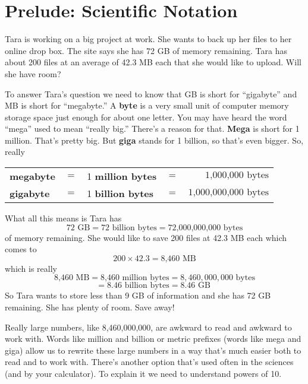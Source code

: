 \section{Prelude: Scientific Notation}

Tara is working on a big project at work.  She wants to back up her files to her online drop box. The site says she has 72 GB of memory remaining.  Tara has about 200 files at an average of 42.3 MB each that she would like to upload.  Will she have room?

To answer Tara's question we need to know that GB is short for ``gigabyte'' and MB is short for ``megabyte.''  A \textbf{byte} is a very small unit of computer memory storage space just enough for about one letter.  You may have heard the word ``mega'' used to mean ``really big.''  There's a reason for that.  \textbf{Mega} is short for 1 million.  That's pretty big.  But \textbf{giga} stands for 1 billion, so that's even bigger. So, really
\begin{center}
\begin{tabular} {lclcr} 
\textbf{megabyte} &$=$&1 \textbf{ million bytes} &$=$&$ \text{1,000,000 bytes}$\\
\textbf{gigabyte} &$=$& 1 \textbf{ billion bytes} &$=$& $\text{1,000,000,000 bytes}$\\ 
\end{tabular}
\end{center}

What all this means is Tara has
$$72\text{ GB} = 72 \text{ billion bytes} = \text{72,000,000,000 bytes}$$
of memory remaining.
She would like to save 200 files at 42.3 MB each which comes to
$$200 \times 42.3 = \text{8,460 MB}$$
which is really 
$$ \text{8,460 MB} = \text{8,460 million bytes} = 8,460,000,000 \text{ bytes}$$
$$= 8.46 \text{ billion bytes} = 8.46 \text{ GB }$$
So Tara wants to store less than 9 GB of information and she has 72 GB remaining.  She has plenty of room.  Save away!

Really large numbers, like 8,460,000,000, are awkward to read and awkward to work with.  Words like million and billion or metric prefixes (words like mega and giga)  allow us to rewrite these large numbers in a way that's much easier both to read and to work with.  There's another option that's used often in the sciences (and by your calculator).  To explain it we need to understand powers of 10.

